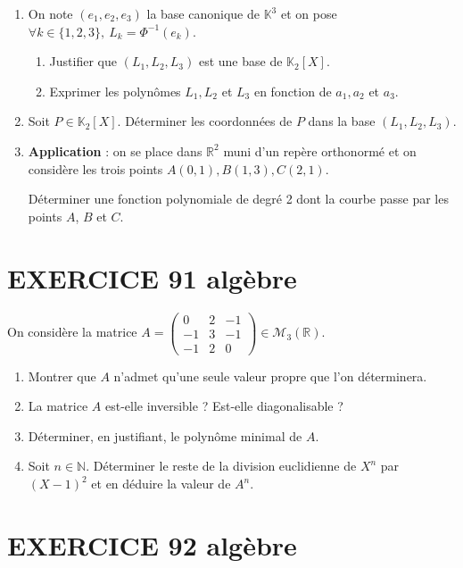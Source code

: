 \documentclass[10pt,oneside]{article}
\begin{document}
\begin{flushleft}
\begin{enumerate}
\item On note $(e_{1}, e_{2}, e_{3})$ la base canonique de $\mathbb K^{3}$ et on pose  $\forall k\in\{1,2,3\}, \:L_{k}=\Phi^{-1}(e_{k})$.

\begin{enumerate}
\item Justifier que $(L_{1}, L_{2}, L_{3})$ est une base de $\mathbb K_{2}[X]$.

\item Exprimer les polynômes $L_{1}, L_{2}$ et $L_{3}$ en fonction de $a_{1}, a_{2}$ et $a_{3}$.
\end{enumerate}

\item Soit $P\in\mathbb K_{2}[X]$. Déterminer les coordonnées de $P$ dans la base $(L_{1}, L_{2}, L_{3})$.

\item  \textbf{Application} : on se place dans $\mathbb R^{2}$ muni d'un repère orthonormé et on considère les trois points $A(0,1), B(1,3), C(2,1)$. 

Déterminer une fonction polynomiale de degré 2 dont la courbe passe par les points $A$, $B$ et $C$.
\end{enumerate}


\section*{EXERCICE 91 \: algèbre}




 On considère la matrice $A=\begin{pmatrix}
0& 2 & -1 \\ 
-1& 3 &-1 \\ 
-1& 2 & 0
\end{pmatrix} \in\mathcal{M}_3(\mathbb{R}).$
\begin{enumerate}
\item Montrer  que $A$ n'admet qu'une seule valeur propre que l'on déterminera. 
\item La matrice $A$ est-elle inversible ? Est-elle diagonalisable ?
\item Déterminer, en  justifiant, le polynôme minimal de $A$. 
\item 
Soit $n\in\mathbb{N}$. Déterminer le reste de la division euclidienne de $X^n$ par $(X-1)^2$ et en déduire la valeur de $A^n$.
\end{enumerate}

\medskip

\section*{EXERCICE 92\: algèbre }


\end{flushleft}
\end{document}
